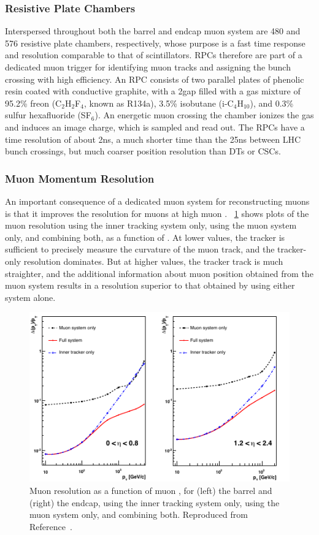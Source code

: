 \subsubsection{Resistive Plate Chambers}
Interspersed throughout both the barrel and endcap muon system are 480 and 576 resistive plate chambers, respectively, whose purpose is a fast time response and resolution comparable to that of scintillators.
RPCs therefore are part of a dedicated muon trigger for identifying muon tracks and assigning the bunch crossing with high efficiency.
An RPC consists of two parallel plates of phenolic resin coated with conductive graphite, with a 2\mm gap filled with a gas mixture of 95.2\% freon (C$_2$H$_2$F$_4$, known as R134a), 3.5\% isobutane (i-C$_4$H$_{10}$), and 0.3\% sulfur hexafluoride (SF$_6$).
An energetic muon crossing the chamber ionizes the gas and induces an image charge, which is sampled and read out.
The RPCs have a time resolution of about 2\unit{ns}, a much shorter time than the 25\unit{ns} between LHC bunch crossings, but much coarser position resolution than DTs or CSCs.

\subsubsection{Muon Momentum Resolution}
An important consequence of a dedicated muon system for reconstructing muons is that it improves the \pT resolution for muons at high muon \pT.
\Fig~\ref{cms:muonpT} shows plots of the muon \pT resolution using the inner tracking system only, using the muon system only, and combining both, as a function of \pT.
At lower \pT values, the tracker is sufficient to precisely measure the curvature of the muon track, and the tracker-only resolution dominates.
But at higher \pT values, the tracker track is much straighter, and the additional information about muon position obtained from the muon system results in a \pT resolution superior to that obtained by using either system alone.

\begin{figure}[tpb]
  \centering
  \includegraphics[width=\textwidth]{figures/cms/MuonMomentumResolution.pdf}
  \caption{Muon \pT resolution as a function of muon \pT, for (left) the barrel and (right) the endcap, using the inner tracking system only, using the muon system only, and combining both. Reproduced from Reference~\cite{Chatrchyan:2008zzk}.}
  \label{cms:muonpT}
\end{figure}

